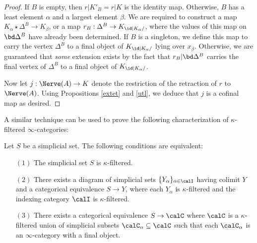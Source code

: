 \begin{proof}
If $B$ is empty, then $r|K'_B=r|K$ is the identity map. Otherwise,
$B$ has a least element $\alpha$ and a largest element $\beta$. We are
required to construct a map $K_{\alpha} \star \Delta^B \rightarrow
K_{\beta}$, or a map $r_B: \Delta^B \rightarrow K_{\id|K_{\alpha}/}$, where
the values of this map on $\bd \Delta^B$ have already been
determined. If $B$ is a singleton, we define this map to carry the
vertex $\Delta^B$ to a final object of $K_{\id|K_{\alpha}/}$ lying
over $x_{\beta}$. Otherwise, we are guaranteed that {\em some}
extension exists by the fact that $r_B|\bd \Delta^B$ carries the
final vertex of $\Delta^B$ to a final object of
$K_{\id|K_{\alpha}/}$.

Now let $j: \Nerve(A) \rightarrow K$ denote the restriction
of the retraction of $r$ to $\Nerve(A)$. Using Propositions \ref{extet}
and \ref{utl}, we deduce that $j$ is a cofinal map as desired.
\end{proof}

A similar technique can be used to prove the following characterization of
$\kappa$-filtered $\infty$-categories:

\begin{proposition}\label{charfiltt}
Let $S$ be a simplicial set. The following conditions are equivalent:
\begin{itemize}
\item[$(1)$] The simplicial set $S$ is $\kappa$-filtered.
\item[$(2)$] There exists a diagram of simplicial sets $\{ Y_{\alpha} \}_{ \alpha \in \calI}$ having
colimit $Y$ and a categorical equivalence $S \rightarrow Y$, 
where each $Y_{\alpha}$ is $\kappa$-filtered and the indexing category $\calI$ is $\kappa$-filtered.
\item[$(3)$] There exists a categorical equivalence $S \rightarrow \calC$ where $\calC$ is a $\kappa$-filtered union of simplicial subsets $\calC_{\alpha} \subseteq \calC$ such that each $\calC_{\alpha}$ is an $\infty$-category with a final object.
\end{itemize}
\end{proposition}

